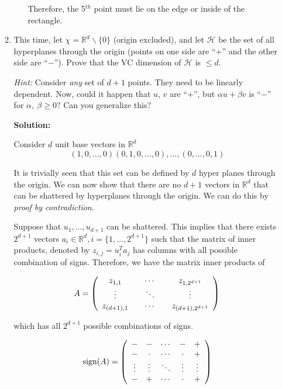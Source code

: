 \documentclass[12pt]{article}
\begin{document}
\begin{enumerate}
\begin{enumerate}
\begin{enumerate}
Therefore, the 5$^{th}$ point must lie on the edge or inside of the rectangle.

\end{enumerate}

\item This time, let $\chi = \mathbb{R}^{d}\backslash \{0\}$ (origin excluded), and let $\mathcal{H}$ be the set of all hyperplanes through the origin (points on one side are ``$+$'' and the other side are ``$-$''). Prove that the VC dimension of $\mathcal{H}$ is $\leq d$.

{\em Hint:} Consider {\em any} set of $d + 1$ points. They need to be linearly dependent. Now, could it happen that $u$, $v$ are ``$+$'', but $\alpha u + \beta v$ is ``$-$'' for $\alpha,\ \beta\geq 0$? Can you generalize this?

{\bf Solution:}

Consider $d$ unit base vectors in $\mathbb{R}^{d}$
\[
  (1,0,\ldots,0)(0,1,0,\ldots,0),\ldots,(0,\ldots,0,1)
\]

It is trivially seen that this set can be defined by $d$ hyper planes through the origin. We can now show that there are no $d+1$ vectors in $\mathbb{R}^{d}$ that can be shattered by hyperplanes through the origin. We can do this by {\em proof by contradiction}.

Suppose that $u_{1},\ldots,u_{d+1}$ can be shattered. This implies that there exists $2^{d+1}$ vectors $a_{i} \in \mathbb{R}^{d}, i = \{1,\ldots,2^{d+1}\}$ such that the matrix of inner products, denoted by $z_{i,j} = u_{i}^{T}a_{j}$ has columns with all possible combination of signs. Therefore, we have the matrix inner products of

\[
  A = \left( \begin{array}{c c c c c}z_{1,1} & & \cdots & & z_{1,2^{d+1}}\\
                          \vdots &  & \ddots & & \vdots\\
                          z_{(d+1),1} & & \cdots & & z_{(d+1),2^{d+1}}\end{array}\right)
\]

which has all $2^{d+1}$ possible combinations of signs.

\[
   \text{sign}(A) = \left(\begin{array}{c c c c c}- & - & \cdots & - & +\\
                          - & \cdot & \cdots & \cdot & +\\
                          \vdots & \vdots & \ddots & \vdots & \vdots\\
                          - & + & \cdots & \cdot & +\end{array}\right)
\]


\end{enumerate}
\end{enumerate}
\end{document}

